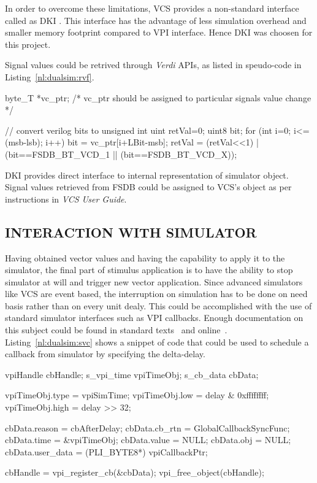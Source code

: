 In order to overcome these limitations, VCS provides a non-standard interface called as DKI . This interface has the advantage of less simulation overhead and smaller memory footprint compared to VPI interface. Hence DKI was choosen for this project.


Signal values could be retrived through {\it Verdi} APIs, as listed in speudo-code in Listing~\ref{nl:dualsim:rvf}.
\begin{newlisting}[caption=Retrieving Values from FSDB,label=nl:dualsim:rvf]
  byte_T *vc_ptr;
  /* vc_ptr should be assigned to particular signals value change */

  // convert verilog bits to unsigned int
  uint retVal=0;
  uint8 bit;
  for (int i=0; i<=(msb-lsb); i++) {
    bit = vc_ptr[i+LBit-msb];
    retVal = (retVal<<1)
           | (bit==FSDB_BT_VCD_1 || (bit==FSDB_BT_VCD_X));
  } 
\end{newlisting}
DKI provides direct interface to internal representation of simulator object. Signal values retrieved from FSDB could be assigned to VCS's object as per instructions in {\it VCS User Guide}\cite[Section~C~Language~Interface>~Direct~C]{VCS:vcs.pdf}.

\subsection{INTERACTION WITH SIMULATOR}
Having obtained vector values and having the capability to apply it to the simulator, the final part of stimulus application is to have the ability to stop simulator at will and trigger new vector application. Since advanced simulators like VCS are event based, the interruption on simulation  has to be done on need basis rather than on every unit dealy. This could be accomplished with the use of standard simulator interfaces such as VPI callbacks. Enough documentation on this subject could be found in standard texts\cite{ss:pli:1999}~\cite{sm:pli:1999} and online\cite{wiki:2013:VPI}~\cite{aw:2013:VPI}. Listing~\ref{nl:dualsim:svc} shows a snippet of code that could be used to schedule a callback from simulator by specifying the delta-delay.

\begin{newlisting}[caption=Scheduling a VPI callback,label=nl:dualsim:svc]
  vpiHandle  cbHandle;
  s_vpi_time vpiTimeObj;
  s_cb_data  cbData;

  vpiTimeObj.type = vpiSimTime;
  vpiTimeObj.low  = delay & 0xffffffff;
  vpiTimeObj.high = delay >> 32;

  cbData.reason    = cbAfterDelay;
  cbData.cb_rtn    = GlobalCallbackSyncFunc;
  cbData.time      = &vpiTimeObj;
  cbData.value     = NULL;
  cbData.obj       = NULL;
  cbData.user_data = (PLI_BYTE8*) vpiCallbackPtr;

  cbHandle = vpi_register_cb(&cbData);
  vpi_free_object(cbHandle);
\end{newlisting}

